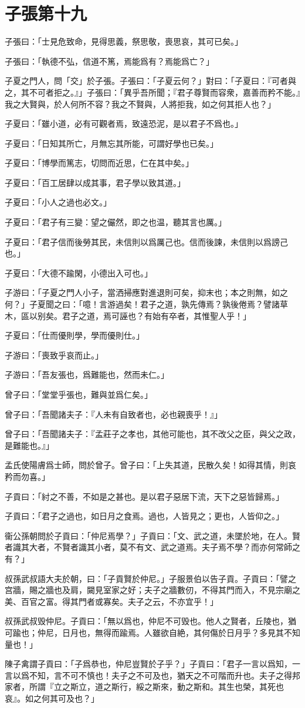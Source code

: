 \section[子張第十九]{子張第十九}

子張曰：「士見危致命，見得思義，祭思敬，喪思哀，其可已矣。」

子張曰：「執德不弘，信道不篤，焉能爲有？焉能爲亡？」

子夏之門人，問「交」於子張。子張曰：「子夏云何？」對曰：「子夏曰：『可者與之，其不可者拒之。』」子張曰：「異乎吾所聞；『君子尊賢而容衆，嘉善而矜不能。』我之大賢與，於人何所不容？我之不賢與，人將拒我，如之何其拒人也？」

子夏曰：「雖小道，必有可觀者焉，致遠恐泥，是以君子不爲也。」

子夏曰：「日知其所亡，月無忘其所能，可謂好學也已矣。」

子夏曰：「博學而篤志，切問而近思，仁在其中矣。」

子夏曰：「百工居肆以成其事，君子學以致其道。」

子夏曰：「小人之過也必文。」

子夏曰：「君子有三變：望之儼然，即之也温，聽其言也厲。」

子夏曰：「君子信而後勞其民，未信則以爲厲己也。信而後諫，未信則以爲謗己也。」

子夏曰：「大德不踰閑，小德出入可也。」

子游曰：「子夏之門人小子，當洒掃應對進退則可矣，抑末也；本之則無，如之何？」子夏聞之曰：「噫！言游過矣！君子之道，孰先傳焉？孰後倦焉？譬諸草木，區以别矣。君子之道，焉可誣也？有始有卒者，其惟聖人乎！」

子夏曰：「仕而優則學，學而優則仕。」

子游曰：「喪致乎哀而止。」

子游曰：「吾友張也，爲難能也，然而未仁。」

曾子曰：「堂堂乎張也，難與並爲仁矣。」

曾子曰：「吾聞諸夫子：『人未有自致者也，必也親喪乎！』」

曾子曰：「吾聞諸夫子：『孟莊子之孝也，其他可能也，其不改父之臣，與父之政，是難能也。』」

孟氏使陽膚爲士師，問於曾子。曾子曰：「上失其道，民散久矣！如得其情，則哀矜而勿喜。」

子貢曰：「紂之不善，不如是之甚也。是以君子惡居下流，天下之惡皆歸焉。」

子貢曰：「君子之過也，如日月之食焉。過也，人皆見之；更也，人皆仰之。」

衞公孫朝問於子貢曰：「仲尼焉學？」子貢曰：「文、武之道，未墜於地，在人。賢者識其大者，不賢者識其小者，莫不有文、武之道焉。夫子焉不學？而亦何常師之有？」

叔孫武叔語大夫於朝，曰：「子貢賢於仲尼。」子服景伯以告子貢。子貢曰：「譬之宫牆，賜之牆也及肩，闚見室家之好；夫子之牆數仞，不得其門而入，不見宗廟之美、百官之富。得其門者或寡矣。夫子之云，不亦宜乎！」

叔孫武叔毁仲尼。子貢曰：「無以爲也，仲尼不可毁也。他人之賢者，丘陵也，猶可踰也；仲尼，日月也，無得而踰焉。人雖欲自絶，其何傷於日月乎？多見其不知量也！」

陳子禽謂子貢曰：「子爲恭也，仲尼豈賢於子乎？」子貢曰：「君子一言以爲知，一言以爲不知，言不可不慎也！夫子之不可及也，猶天之不可階而升也。夫子之得邦家者，所謂『立之斯立，道之斯行，綏之斯來，動之斯和。其生也榮，其死也哀』。如之何其可及也？」
